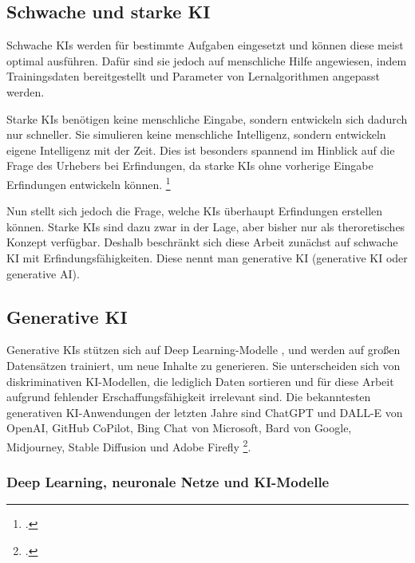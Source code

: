 \subsection{Schwache und starke KI}

Schwache KIs werden für bestimmte Aufgaben eingesetzt und 
können diese meist optimal ausführen. 
Dafür sind sie jedoch auf menschliche Hilfe angewiesen, 
indem Trainingsdaten bereitgestellt und 
Parameter von Lernalgorithmen angepasst werden.

Starke KIs benötigen keine menschliche Eingabe, 
sondern entwickeln sich dadurch nur schneller. 
Sie simulieren keine menschliche Intelligenz, 
sondern entwickeln eigene Intelligenz mit der Zeit. 
Dies ist besonders spannend im Hinblick auf die Frage 
des Urhebers bei Erfindungen, 
da starke KIs ohne vorherige Eingabe Erfindungen entwickeln können.
\footcite{WasIstStarke2023}

Nun stellt sich jedoch die Frage,
welche KIs überhaupt 
Erfindungen erstellen können. Starke KIs sind dazu zwar in 
der Lage, aber bisher nur als theroretisches Konzept verfügbar. 
Deshalb beschränkt sich diese Arbeit zunächst auf schwache KI
mit Erfindungsfähigkeiten. Diese nennt man generative KI 
(generative KI oder generative AI).

\subsection{Generative KI}
Generative KIs
stützen sich auf Deep Learning-Modelle , 
und werden auf großen Datensätzen trainiert, um neue Inhalte zu generieren.  
Sie unterscheiden sich von diskriminativen KI-Modellen, 
die lediglich Daten sortieren und für diese Arbeit aufgrund fehlender
Erschaffungsfähigkeit irrelevant sind. 
Die bekanntesten generativen KI-Anwendungen der letzten Jahre sind
ChatGPT und DALL-E von OpenAI, GitHub CoPilot, Bing Chat von Microsoft, 
Bard von Google, Midjourney, Stable Diffusion und Adobe Firefly \footcite{WasIstGenerative}.

\subsubsection{Deep Learning, neuronale Netze und KI-Modelle}

